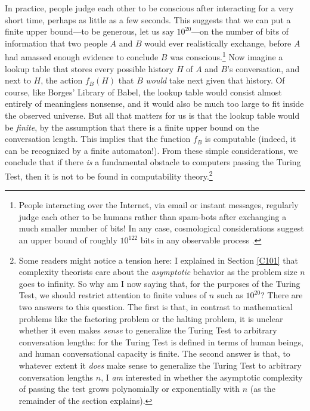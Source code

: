 \documentclass[12pt,onecolumn]{article}%
\begin{document}
In practice, people judge each other to be conscious after interacting for a
very short time, perhaps as little as a few seconds. This suggests that we
can put a finite upper bound---to be generous, let us say $10^{20}$---on the
number of bits of information that two people $A$ and $B$ would ever
realistically exchange, before $A$ had amassed enough evidence to conclude $B$
was conscious.\footnote{People interacting over the Internet, via email or
instant messages, regularly judge each other to be humans rather than
spam-bots after exchanging a much smaller number of bits! In any case,
cosmological considerations suggest an upper bound of roughly $10^{122}$ bits
in any observable process \cite{bousso:vac}.} Now imagine a lookup table
that stores every possible history $H$ of $A$ and $B$'s conversation, and
next to $H$, the action $f_{B}(H)  $ that $B$ \textit{would}
take next given that history. Of course, like Borges' Library of Babel, the
lookup table would consist almost entirely of meaningless nonsense, and it
would also be much too large to fit inside the observed universe. But all
that matters for us is that the lookup table would be \textit{finite}, by the
assumption that there is a finite upper bound on the conversation length.
 This implies that the function $f_{B}$ is computable (indeed, it can be
recognized by a finite automaton!). From these simple considerations, we
conclude that if there \textit{is} a fundamental obstacle to computers passing
the Turing Test, then it is not to be found in computability
theory.\footnote{Some readers might notice a tension here: I explained in
Section \ref{C101} that complexity theorists care about the
\textit{asymptotic} behavior as the problem size $n$ goes to infinity. So
why am I now saying that, for the purposes of the Turing Test, we should
restrict attention to finite values of $n$ such as $10^{20}$? There are two
answers to this question. The first is that, in contrast to mathematical
problems like the factoring problem or the halting problem, it is unclear
whether it even makes \textit{sense} to generalize the Turing Test to
arbitrary conversation lengths: for the Turing Test is defined in terms of
human beings, and human conversational capacity is finite. The second answer
is that, to whatever extent it \textit{does} make sense to generalize the
Turing Test to arbitrary conversation lengths $n$, I \textit{am} interested in
whether the asymptotic complexity of passing the test grows polynomially or
exponentially with $n$ (as the remainder of the section explains).}
\end{document}
